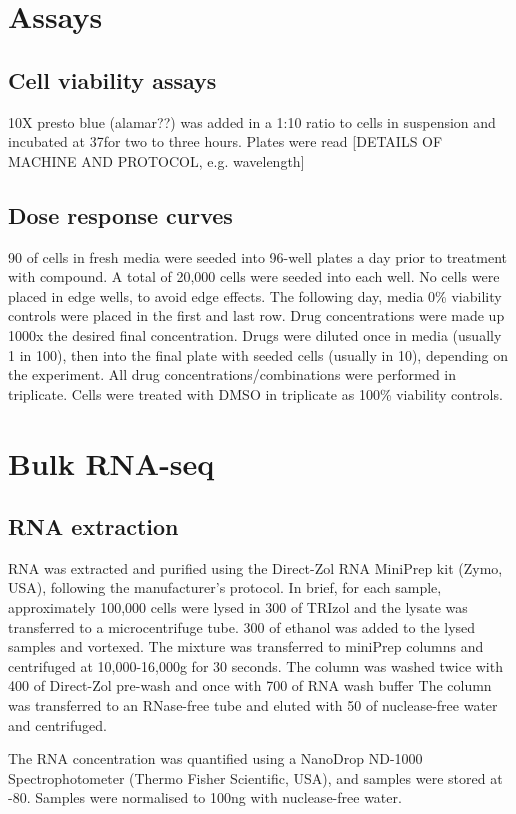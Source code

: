 \section{Assays}
\subsection{Cell viability assays}
10X presto blue (alamar??) was added in a 1:10 ratio to cells in suspension and incubated at 37\C for two to three hours.
Plates were read [DETAILS OF MACHINE AND PROTOCOL, e.g. wavelength]

\subsection{Dose response curves}\label{subsec:method_doseresponse}
90\ul{} of cells in fresh media were seeded into 96-well plates a day prior to treatment with compound.
A total of 20,000 cells were seeded into each well.
No cells were placed in edge wells, to avoid edge effects.
The following day, media 0\% viability controls were placed in the first and last row.
Drug concentrations were made up 1000x the desired final concentration.
Drugs were diluted once in media (usually 1 in 100), then into the final plate with seeded cells (usually in 10), depending on the experiment.
All drug concentrations/combinations were performed in triplicate.
Cells were treated with DMSO in triplicate as 100\% viability controls.

\section{Bulk RNA-seq}
\subsection{RNA extraction}
RNA was extracted and purified using the Direct-Zol RNA MiniPrep kit (Zymo, USA), following the manufacturer's protocol.
In brief, for each sample, approximately 100,000 cells were lysed in 300\ul{} of TRIzol and the lysate was transferred to a microcentrifuge tube.
300\ul{} of ethanol was added to the lysed samples and vortexed.
The mixture was transferred to miniPrep columns and centrifuged at 10,000-16,000g for 30 seconds.
The column was washed twice with 400\ul{} of Direct-Zol pre-wash and once with 700\ul{} of RNA wash buffer
The column was transferred to an RNase-free tube and eluted with 50\ul{} of nuclease-free water and centrifuged.

The RNA concentration was quantified using a NanoDrop ND-1000 Spectrophotometer (Thermo Fisher Scientific, USA), and samples were stored at -80\C{}.
Samples were normalised to 100\si{\ng} with nuclease-free water.


